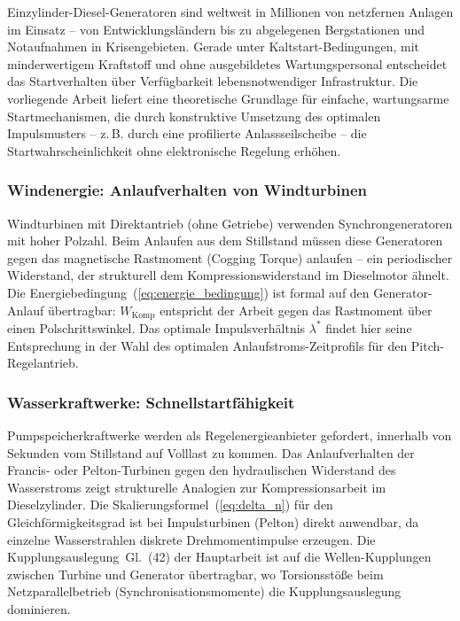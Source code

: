 ﻿\documentclass[a4paper,12pt]{article}
\begin{document}
Einzylinder-Diesel-Generatoren sind weltweit in Millionen von
netzfernen Anlagen im Einsatz -- von Entwicklungsländern bis zu
abgelegenen Bergstationen und Notaufnahmen in Krisengebieten.
Gerade unter Kaltstart-Bedingungen, mit minderwertigem Kraftstoff
und ohne ausgebildetes Wartungspersonal entscheidet das
Startverhalten über Verfügbarkeit lebensnotwendiger Infrastruktur.
Die vorliegende Arbeit liefert eine theoretische Grundlage für
einfache, wartungsarme Startmechanismen, die durch konstruktive
Umsetzung des optimalen Impulsmusters -- z.\,B. durch eine
profilierte Anlassseilscheibe -- die Startwahrscheinlichkeit ohne
elektronische Regelung erhöhen.

\subsubsection{Windenergie: Anlaufverhalten von Windturbinen}

Windturbinen mit Direktantrieb (ohne Getriebe) verwenden
Synchrongeneratoren mit hoher Polzahl. Beim Anlaufen aus dem
Stillstand müssen diese Generatoren gegen das magnetische
Rastmoment (Cogging Torque) anlaufen -- ein periodischer
Widerstand, der strukturell dem Kompressionswiderstand im
Dieselmotor ähnelt. Die Energiebedingung~(\ref{eq:energie_bedingung})
ist formal auf den Generator-Anlauf übertragbar:
$W_\text{Komp}$ entspricht der Arbeit gegen das Rastmoment
über einen Polschrittswinkel. Das optimale Impulsverhältnis
$\lambda^*$ findet hier seine Entsprechung in der Wahl des
optimalen Anlaufstroms-Zeitprofils für den Pitch-Regelantrieb.

\subsubsection{Wasserkraftwerke: Schnellstartfähigkeit}

Pumpspeicherkraftwerke werden als Regelenergieanbieter gefordert,
innerhalb von Sekunden vom Stillstand auf Volllast zu kommen.
Das Anlaufverhalten der Francis- oder Pelton-Turbinen gegen
den hydraulischen Widerstand des Wasserstroms zeigt strukturelle
Analogien zur Kompressionsarbeit im Dieselzylinder. Die
Skalierungsformel~(\ref{eq:delta_n}) für den Gleichförmigkeitsgrad
ist bei Impulsturbinen (Pelton) direkt anwendbar, da
einzelne Wasserstrahlen diskrete Drehmomentimpulse erzeugen.
Die Kupplungsauslegung~Gl.~(42) der Hauptarbeit ist auf
die Wellen-Kupplungen zwischen Turbine und Generator
übertragbar, wo Torsionsstöße beim Netzparallelbetrieb
(Synchronisationsmomente) die Kupplungsauslegung dominieren.
\end{document}

